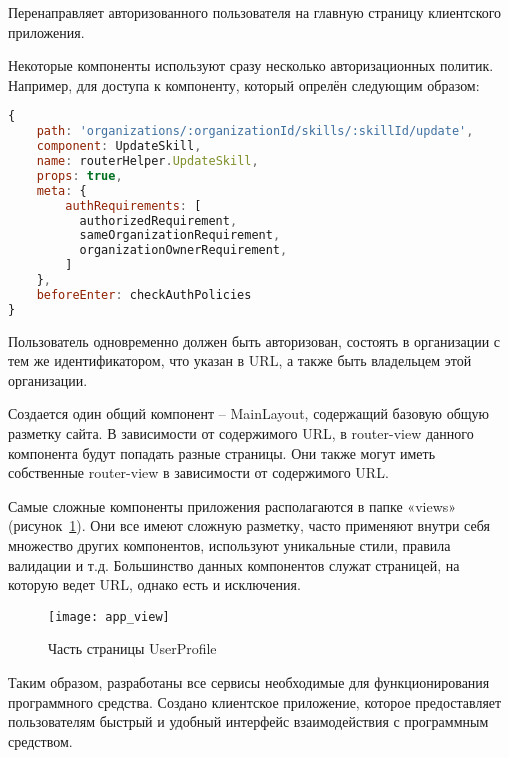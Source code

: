 Перенаправляет авторизованного пользователя на главную страницу клиентского приложения.

Некоторые компоненты используют сразу несколько авторизационных политик. Например, для доступа к компоненту, который опрелён следующим образом:

\begin{lstlisting}[language=javascript]
{
    path: 'organizations/:organizationId/skills/:skillId/update',
    component: UpdateSkill,
    name: routerHelper.UpdateSkill,
    props: true,
    meta: {
        authRequirements: [
          authorizedRequirement,
          sameOrganizationRequirement,
          organizationOwnerRequirement,
        ]
    },
    beforeEnter: checkAuthPolicies
}
\end{lstlisting}

Пользователь одновременно должен быть авторизован, состоять в организации с тем же идентификатором, что указан в URL, а также быть владельцем этой организации.

Создается один общий компонент – MainLayout, содержащий базовую общую разметку сайта. В зависимости от содержимого URL, в router-view данного компонента будут попадать разные страницы. Они также могут иметь собственные router-view в зависимости от содержимого URL.

Самые сложные компоненты приложения располагаются в папке «views» (рисунок~\ref{fig:app_view}). Они все имеют сложную разметку, часто применяют внутри себя множество других компонентов, используют уникальные стили, правила валидации и т.д. Большинство данных компонентов служат страницей, на которую ведет URL, однако есть и исключения.

\begin{figure}[h]
    \centering
    \texttt{[image: app\_view]}
    \caption{Часть страницы UserProfile}\label{fig:app_view}
\end{figure}

Таким образом, разработаны все сервисы необходимые для функционирования программного средства. Создано клиентское приложение, которое предоставляет пользователям быстрый и удобный интерфейс взаимодействия с программным средством.

